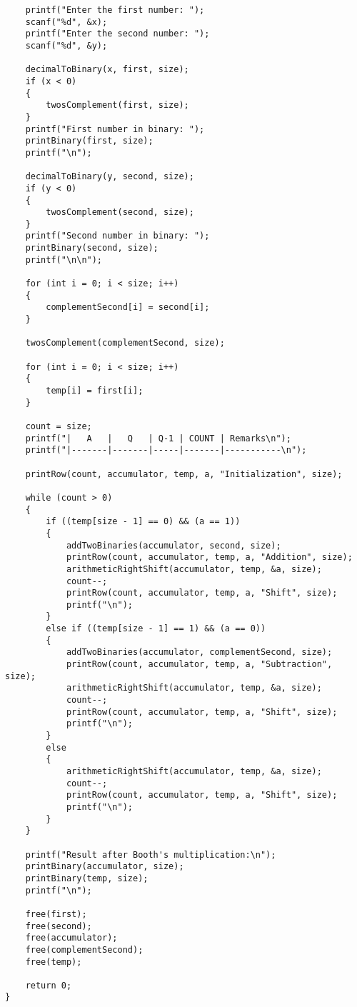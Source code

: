 \documentclass[a4paper,12pt]{article}
\begin{document}
\begin{verbatim}
    printf("Enter the first number: ");
    scanf("%d", &x);
    printf("Enter the second number: ");
    scanf("%d", &y);

    decimalToBinary(x, first, size);
    if (x < 0)
    {
        twosComplement(first, size);
    }
    printf("First number in binary: ");
    printBinary(first, size);
    printf("\n");

    decimalToBinary(y, second, size);
    if (y < 0)
    {
        twosComplement(second, size);
    }
    printf("Second number in binary: ");
    printBinary(second, size);
    printf("\n\n");

    for (int i = 0; i < size; i++)
    {
        complementSecond[i] = second[i];
    }

    twosComplement(complementSecond, size);

    for (int i = 0; i < size; i++)
    {
        temp[i] = first[i];
    }

    count = size;
    printf("|   A   |   Q   | Q-1 | COUNT | Remarks\n");
    printf("|-------|-------|-----|-------|-----------\n");

    printRow(count, accumulator, temp, a, "Initialization", size);

    while (count > 0)
    {
        if ((temp[size - 1] == 0) && (a == 1))
        {
            addTwoBinaries(accumulator, second, size);
            printRow(count, accumulator, temp, a, "Addition", size);
            arithmeticRightShift(accumulator, temp, &a, size);
            count--;
            printRow(count, accumulator, temp, a, "Shift", size);
            printf("\n");
        }
        else if ((temp[size - 1] == 1) && (a == 0))
        {
            addTwoBinaries(accumulator, complementSecond, size);
            printRow(count, accumulator, temp, a, "Subtraction", size);
            arithmeticRightShift(accumulator, temp, &a, size);
            count--;
            printRow(count, accumulator, temp, a, "Shift", size);
            printf("\n");
        }
        else
        {
            arithmeticRightShift(accumulator, temp, &a, size);
            count--;
            printRow(count, accumulator, temp, a, "Shift", size);
            printf("\n");
        }
    }

    printf("Result after Booth's multiplication:\n");
    printBinary(accumulator, size);
    printBinary(temp, size);
    printf("\n");

    free(first);
    free(second);
    free(accumulator);
    free(complementSecond);
    free(temp);

    return 0;
}
\end{verbatim}
\end{document}
